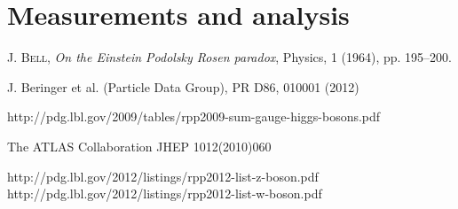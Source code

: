 \documentclass[a4paper,10pt]{article}
\begin{document}
\section{Measurements and analysis}



\begin{thebibliography}{99}

     \textsc{J. Bell}, \textit{On the Einstein Podolsky Rosen paradox}, Physics, 1 (1964), pp. 195–200.

   J. Beringer et al. (Particle Data Group), PR D86, 010001 (2012)

   http://pdg.lbl.gov/2009/tables/rpp2009-sum-gauge-higgs-bosons.pdf

   The ATLAS Collaboration JHEP 1012(2010)060

   http://pdg.lbl.gov/2012/listings/rpp2012-list-z-boson.pdf
	http://pdg.lbl.gov/2012/listings/rpp2012-list-w-boson.pdf
\end{thebibliography}
\end{document}
